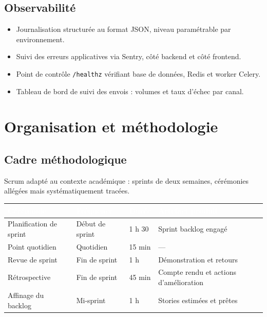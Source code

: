 \documentclass[11pt,a4paper]{article}
\newcommand{\hd}[1]{\textcolor{white}{\sffamily\bfseries\small #1}}
\newcommand{\rowhead}{\rowcolor{primary}}
\begin{document}
\subsection{Observabilité}

\begin{itemize}
  \item Journalisation structurée au format JSON, niveau paramétrable par environnement.
  \item Suivi des erreurs applicatives via Sentry, côté backend et côté frontend.
  \item Point de contrôle \texttt{/healthz} vérifiant base de données, Redis et worker Celery.
  \item Tableau de bord de suivi des envois : volumes et taux d'échec par canal.
\end{itemize}

\section{Organisation et méthodologie}

\subsection{Cadre méthodologique}

Scrum adapté au contexte académique : sprints de deux semaines, cérémonies allégées mais
systématiquement tracées.

\noindent
\begin{tabularx}{\textwidth}{@{}R{3.6cm} R{2.6cm} C{1.6cm} L@{}}
\toprule
\rowhead \hd{Cérémonie} & \hd{Fréquence} & \hd{Durée} & \hd{Artefact produit} \\
\midrule
Planification de sprint & Début de sprint & 1 h 30 & Sprint backlog engagé \\
Point quotidien & Quotidien & 15 min & — \\
Revue de sprint & Fin de sprint & 1 h & Démonstration et retours \\
Rétrospective & Fin de sprint & 45 min & Compte rendu et actions d'amélioration \\
Affinage du backlog & Mi-sprint & 1 h & Stories estimées et prêtes \\
\bottomrule
\end{tabularx}
\end{document}
